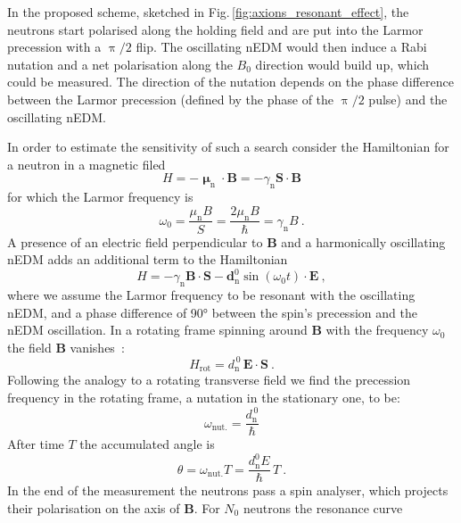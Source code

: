 In the proposed scheme, sketched in Fig.\,\ref{fig:axions_resonant_effect}, the neutrons start polarised along the holding field and are put into the Larmor precession with a $\uppi/2$ flip. The oscillating nEDM would then induce a Rabi nutation and a net polarisation along the $B_0$ direction would build up, which could be measured. The direction of the nutation depends on the phase difference between the Larmor precession (defined by the phase of the $\uppi/2$ pulse) and the oscillating nEDM\@.

In order to estimate the sensitivity of such a search consider the Hamiltonian for a neutron in a magnetic filed
\begin{equation}
  H = - \boldsymbol{\upmu}_\text{n} \cdot \mathbf{B} = - \gamma_\text{n} \mathbf{S} \cdot \mathbf{B}
\end{equation}
for which the Larmor frequency is
\begin{equation}
  \omega_0 = \frac{\mu_\text{n} B}{S} = \frac{2 \mu_\text{n} B}{\hbar} = \gamma_\text{n} B \ .
\end{equation}
A presence of an electric field perpendicular to $\mathbf{B}$ and a harmonically oscillating nEDM adds an additional term to the Hamiltonian
\begin{equation}
  H = - \gamma_\text{n} \mathbf{B} \cdot \mathbf{S} - \mathbf{d}_\text{n}^0 \sin (\omega_0 t) \cdot \mathbf{E} \ ,
\end{equation}
where we assume the Larmor frequency to be resonant with the oscillating nEDM, and a phase difference of \ang{90} between the spin's precession and the nEDM oscillation. In a rotating frame spinning around $\mathbf{B}$ with the frequency $\omega_0$ the field $\mathbf{B}$ vanishes~\cite{RamseyBook}:
\begin{equation}
  H_\text{rot} = d_\text{n}^{\,0} \, \mathbf{E} \cdot \mathbf{S} \ .
\end{equation}
Following the analogy to a rotating transverse field we find the precession frequency in the rotating frame, a nutation in the stationary one, to be:
\begin{equation}
  \omega_\text{nut.} = \frac{d_\text{n}^{\,0}}{\hbar}
\end{equation}
After time $T$ the accumulated angle is
\begin{equation}
  \theta = \omega_\text{nut.} T = \frac{d_\text{n}^0 E }{\hbar} \, T \ .
  \label{eq:resonant_the_angle}
\end{equation}
In the end of the measurement the neutrons pass a spin analyser, which projects their polarisation on the axis of $\mathbf{B}$. For $N_0$ neutrons the resonance curve

